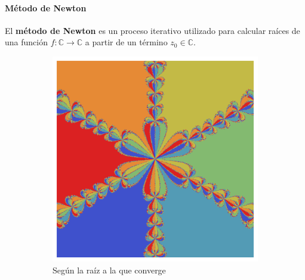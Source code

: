 \begin{frame}{\insertsectionhead}
\framesubtitle{Método de Newton}

El \textbf{método de Newton} es un proceso iterativo utilizado para calcular raíces de una función $f:\mathbb C \longrightarrow\mathbb C$ a partir de un término $z_0\in\mathbb C$.

\begin{figure}[ht!]
\hspace{\fill}
    \begin{subfigure}[b]{0.3\textwidth}
      \includegraphics[width=\textwidth]{screenshots/cuencas-4.png}
      \caption*{Según la raíz a la que converge}
    \end{subfigure}
    \hspace{\fill}
    \begin{subfigure}[b]{0.3\textwidth}

\end{subfigure}
\end{figure}
\end{frame}
